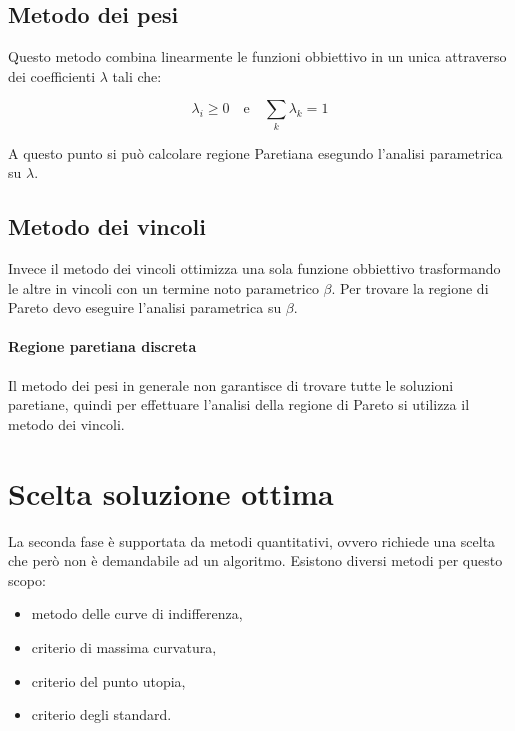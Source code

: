 \subsection{Metodo dei pesi}
Questo metodo combina linearmente le funzioni obbiettivo in un unica attraverso dei coefficienti $\lambda$ tali che:

\begin{equation*}
	\lambda_i \geq 0 \quad \text{e} \quad \sum_k \lambda_k = 1
\end{equation*}

A questo punto si può calcolare regione Paretiana esegundo l'analisi parametrica su $\lambda$. 

\subsection{Metodo dei vincoli}
Invece il metodo dei vincoli ottimizza una sola funzione obbiettivo trasformando le altre in vincoli con un termine noto parametrico $\beta$. Per trovare la regione di Pareto devo eseguire l'analisi parametrica su $\beta$.

\paragraph{Regione paretiana discreta}
Il metodo dei pesi in generale non garantisce di trovare tutte le soluzioni paretiane, quindi per effettuare l'analisi della regione di Pareto si utilizza il metodo dei vincoli.

\section{Scelta soluzione ottima}
La seconda fase è supportata da metodi quantitativi, ovvero richiede una scelta che però non è demandabile ad un algoritmo.
Esistono diversi metodi per questo scopo:

\begin{itemize}
	\item metodo delle curve di indifferenza,
	\item criterio di massima curvatura,
	\item criterio del punto utopia,
	\item criterio degli standard.
\end{itemize}
